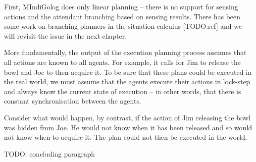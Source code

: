First, MIndiGolog does only linear planning -- there is no support
for sensing actions and the attendant branching based on sensing results.
There has been some work on branching planners in the situation calculus
{[}TODO:ref] and we will revisit the issue in the next chapter.

More fundamentally, the output of the execution planning process assumes
that all actions are known to all agents. For example, it calls for
Jim to release the bowl and Joe to then acquire it. To be sure that
these plans could be executed in the real world, we must assume that
the agents execute their actions in lock-step and always know the
current state of execution -- in other words, that there is constant
synchronisation between the agents.

Consider what would happen, by contrast, if the action of Jim releasing
the bowl was hidden from Joe. He would not know when it has been released
and so would not know when to acquire it. The plan could not then
be executed in the world.

TODO: concluding paragraph

